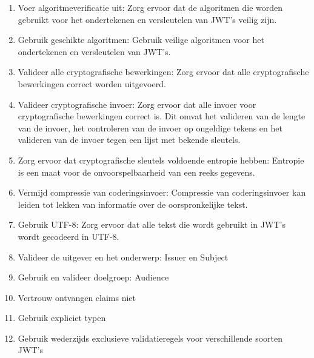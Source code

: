   \begin{enumerate}[label=\textbf{-}]
    \item Voer algoritmeverificatie uit: Zorg ervoor dat de algoritmen die worden gebruikt voor het ondertekenen en versleutelen van JWT's veilig zijn.
    \item Gebruik geschikte algoritmen: Gebruik veilige algoritmen voor het ondertekenen en versleutelen van JWT's.
    \item Valideer alle cryptografische bewerkingen: Zorg ervoor dat alle cryptografische bewerkingen correct worden uitgevoerd.
    \item Valideer cryptografische invoer: Zorg ervoor dat alle invoer voor cryptografische bewerkingen correct is. Dit omvat het valideren van de lengte van de invoer, het controleren van de invoer op ongeldige tekens en het valideren van de invoer tegen een lijst met bekende sleutels.
    \item Zorg ervoor dat cryptografische sleutels voldoende entropie hebben: Entropie is een maat voor de onvoorspelbaarheid van een reeks gegevens.
    \item Vermijd compressie van coderingsinvoer: Compressie van coderingsinvoer kan leiden tot lekken van informatie over de oorspronkelijke tekst.
    \item Gebruik UTF-8: Zorg ervoor dat alle tekst die wordt gebruikt in JWT's wordt gecodeerd in UTF-8.
    \item Valideer de uitgever en het onderwerp: Issuer en Subject
    \item Gebruik en valideer doelgroep: Audience
    \item Vertrouw ontvangen claims niet
    \item Gebruik expliciet typen
    \item Gebruik wederzijds exclusieve validatieregels voor verschillende soorten JWT's
  \end{enumerate}
  \autocite{Sheffer2020}


